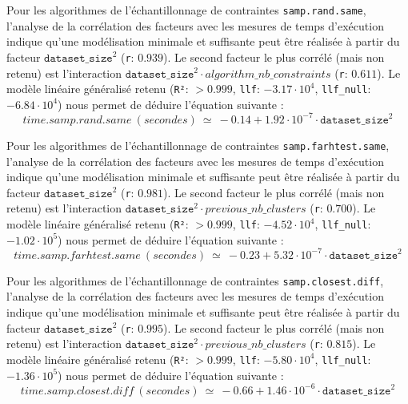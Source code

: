 			Pour les algorithmes de l'échantillonnage de contraintes \texttt{samp.rand.same}, l'analyse de la corrélation des facteurs avec les mesures de temps d'exécution indique qu'une modélisation minimale et suffisante peut être réalisée à partir du facteur $\texttt{dataset\_size}^{2}$ (\texttt{r}: $0.939$).
			Le second facteur le plus corrélé (mais non retenu) est l'interaction $\texttt{dataset\_size}^{2} \cdot algorithm\_nb\_constraints$ (\texttt{r}: $0.611$).
			Le modèle linéaire généralisé retenu (\texttt{R²}: $> 0.999$, \texttt{llf}: $-3.17 \cdot 10^{4}$, \texttt{llf\_null}: $-6.84 \cdot 10^{4}$) nous permet de déduire l'équation suivante :
			\begin{equation}
				time.samp.rand.same~(secondes)~
				\simeq~-0.14 + 1.92 \cdot 10^{-7} \cdot \texttt{dataset\_size}^{2}
			\end{equation}
			
			Pour les algorithmes de l'échantillonnage de contraintes \texttt{samp.farhtest.same}, l'analyse de la corrélation des facteurs avec les mesures de temps d'exécution indique qu'une modélisation minimale et suffisante peut être réalisée à partir du facteur $\texttt{dataset\_size}^{2}$ (\texttt{r}: $0.981$).
			Le second facteur le plus corrélé (mais non retenu) est l'interaction $\texttt{dataset\_size}^{2} \cdot previous\_nb\_clusters$ (\texttt{r}: $0.700$).
			Le modèle linéaire généralisé retenu (\texttt{R²}: $> 0.999$, \texttt{llf}: $-4.52 \cdot 10^{4}$, \texttt{llf\_null}: $-1.02 \cdot 10^{5}$) nous permet de déduire l'équation suivante :
			\begin{equation}
				time.samp.farhtest.same~(secondes)~
				\simeq~-0.23 + 5.32 \cdot 10^{-7} \cdot \texttt{dataset\_size}^{2}
			\end{equation}
			
			Pour les algorithmes de l'échantillonnage de contraintes \texttt{samp.closest.diff}, l'analyse de la corrélation des facteurs avec les mesures de temps d'exécution indique qu'une modélisation minimale et suffisante peut être réalisée à partir du facteur $\texttt{dataset\_size}^{2}$ (\texttt{r}: $0.995$).
			Le second facteur le plus corrélé (mais non retenu) est l'interaction $\texttt{dataset\_size}^{2} \cdot previous\_nb\_clusters$ (\texttt{r}: $0.815$).
			Le modèle linéaire généralisé retenu (\texttt{R²}: $> 0.999$, \texttt{llf}: $-5.80 \cdot 10^{4}$, \texttt{llf\_null}: $-1.36 \cdot 10^{5}$) nous permet de déduire l'équation suivante :
			\begin{equation}
				time.samp.closest.diff~(secondes)~
				\simeq~-0.66 + 1.46 \cdot 10^{-6} \cdot \texttt{dataset\_size}^{2}
			\end{equation}
			
